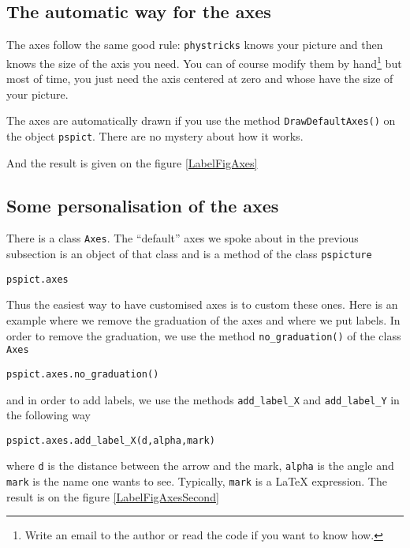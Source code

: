 \subsection{The automatic way for the axes}

The axes follow the same good rule: \verb+phystricks+ knows your picture and then knows the size of the axis you need. You can of course modify them by hand\footnote{Write an email to the author or read the code if you want to know how.} but most of time, you just need the axis centered at zero and whose have the size of your picture.

The axes are automatically drawn if you use the method \verb+DrawDefaultAxes()+ on the object \verb+pspict+.
There are no mystery about how it works.


And the result is given on the figure \ref{LabelFigAxes}
\newcommand{\CaptionFigAxes}{Example of axes that are adjusting themselves.}


\subsection{Some personalisation of the axes}

There is a class \verb+Axes+. The ``default'' axes we spoke about in the previous subsection is an object of that class and is a method of the class \verb+pspicture+
\begin{verbatim}
pspict.axes
\end{verbatim}
Thus the easiest way to have customised axes is to custom these ones. Here is an example where we remove the graduation of the axes and where we put labels. In order to remove the graduation, we use the method \verb+no_graduation()+ of the class \verb+Axes+
\begin{verbatim}
pspict.axes.no_graduation()
\end{verbatim}
and in order to add labels, we use the methods \verb+add_label_X+ and \verb+add_label_Y+ in the following way
\begin{verbatim}
pspict.axes.add_label_X(d,alpha,mark)
\end{verbatim}
where \verb+d+ is the distance between the arrow and the mark, \verb+alpha+ is the angle and \verb+mark+ is the name one wants to see. Typically, \verb+mark+ is a \LaTeX{} expression.
The result is on the figure \ref{LabelFigAxesSecond}
\newcommand{\CaptionFigAxesSecond}{Some fewly customised axes for the function $x\mapsto\sinh(x/2)$.}


